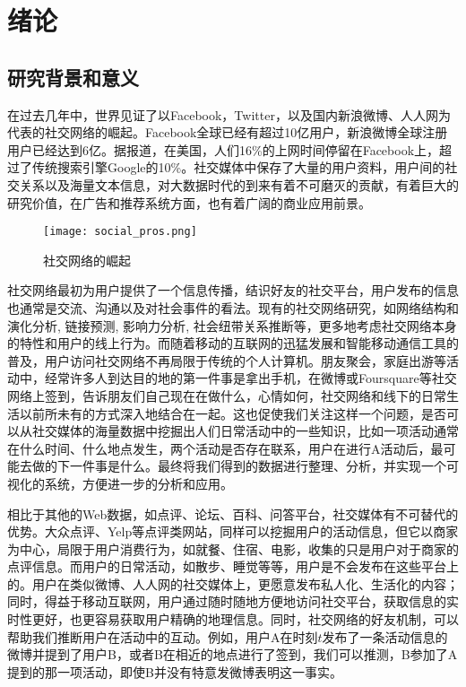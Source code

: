 \chapter{绪论}
\section{研究背景和意义}
在过去几年中，世界见证了以Facebook，Twitter，以及国内新浪微博、人人网为代表的社交网络的崛起。Facebook全球已经有超过10亿用户，新浪微博全球注册用户已经达到6亿。据报道，在美国，人们16\%的上网时间停留在Facebook上，超过了传统搜索引擎Google的10\%。社交媒体中保存了大量的用户资料，用户间的社交关系以及海量文本信息，对大数据时代的到来有着不可磨灭的贡献，有着巨大的研究价值，在广告和推荐系统方面，也有着广阔的商业应用前景。

\begin{figure}[!h]
\centering
\texttt{[image: social\_pros.png]}
\caption{社交网络的崛起}
\end{figure}

社交网络最初为用户提供了一个信息传播，结识好友的社交平台，用户发布的信息也通常是交流、沟通以及对社会事件的看法。现有的社交网络研究，如网络结构和演化分析\cite{leskovec2008microscopic}, 链接预测\cite{liben2007link}, 影响力分析\cite{tang2009social}, 社会纽带关系推断\cite{tang2011learning}等，更多地考虑社交网络本身的特性和用户的线上行为。而随着移动的互联网的迅猛发展和智能移动通信工具的普及，用户访问社交网络不再局限于传统的个人计算机。朋友聚会，家庭出游等活动中，经常许多人到达目的地的第一件事是拿出手机，在微博或Foursquare等社交网络上签到，告诉朋友们自己现在在做什么，心情如何，社交网络和线下的日常生活以前所未有的方式深入地结合在一起。这也促使我们关注这样一个问题，是否可以从社交媒体的海量数据中挖掘出人们日常活动中的一些知识，比如一项活动通常在什么时间、什么地点发生，两个活动是否存在联系，用户在进行A活动后，最可能去做的下一件事是什么。最终将我们得到的数据进行整理、分析，并实现一个可视化的系统，方便进一步的分析和应用。

相比于其他的Web数据，如点评、论坛、百科、问答平台，社交媒体有不可替代的优势。大众点评、Yelp等点评类网站，同样可以挖掘用户的活动信息，但它以商家为中心，局限于用户消费行为，如就餐、住宿、电影，收集的只是用户对于商家的点评信息。而用户的日常活动，如散步、睡觉等等，用户是不会发布在这些平台上的。用户在类似微博、人人网的社交媒体上，更愿意发布私人化、生活化的内容；同时，得益于移动互联网，用户通过随时随地方便地访问社交平台，获取信息的实时性更好，也更容易获取用户精确的地理信息。同时，社交网络的好友机制，可以帮助我们推断用户在活动中的互动。例如，用户A在时刻$t$发布了一条活动信息的微博并提到了用户B，或者B在相近的地点进行了签到，我们可以推测，B参加了A提到的那一项活动，即使B并没有特意发微博表明这一事实。

